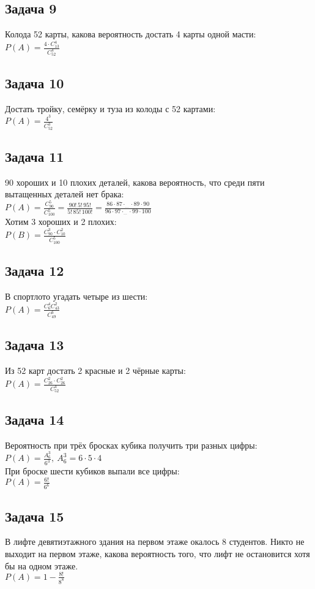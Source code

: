 \documentclass[12pt, a4paper]{article}
\begin{document}
    \subsection*{Задача 9}
    Колода 52 карты, какова вероятность достать 4 карты одной масти:\\
    $P(A) = \frac{4\cdot C^4_{13}}{C_{52}^4}$
    \subsection*{Задача 10}
    Достать тройку, семёрку и туза из колоды с 52 картами:\\
    $P(A) = \frac{4^3}{C_{52}^3}$
    \subsection*{Задача 11}
    90 хороших и 10 плохих деталей, какова вероятность, что среди пяти вытащенных деталей нет брака:\\
    $P(A) = \frac{C^5_{90}}{C^5_{100}} = \frac{90!\,5!\,95!}{5!\,85!\,100!} = \frac{86\cdot 87\cdot_{\dots}\cdot 89\cdot 90}{96\cdot 97\cdot_{\dots}\cdot 99\cdot 100}$\\
    Хотим 3 хороших и 2 плохих:\\
    $P(B) = \frac{C_{90}^3\cdot C_{10}^2}{C_{100}^5}$
    \subsection*{Задача 12}
    В спортлото угадать четыре из шести:\\
    $P(A) = \frac{C_6^4C_{43}^2}{C_{49}^6}$
    \subsection*{Задача 13}
    Из 52 карт достать 2 красные и 2 чёрные карты:\\
    $P(A) = \frac{C^2_{26}\cdot C^2_{26}}{C^4_{52}}$
    \subsection*{Задача 14}
    Вероятность при трёх бросках кубика получить три разных цифры:\\
    $P(A) = \frac{A^3_6}{6^3},\ A^3_6 = 6\cdot 5\cdot 4$\\
    При броске шести кубиков выпали все цифры:\\
    $P(A) = \frac{6!}{6^6}$
    \subsection*{Задача 15}
    В лифте девятиэтажного здания на первом этаже окалось 8 студентов. Никто не выходит на первом этаже, 
    какова вероятность того, что лифт не остановится хотя бы на одном этаже.\\
    $P(A) = 1 - \frac{8!}{8^8}$
\end{document}
